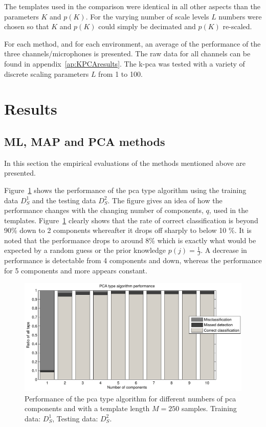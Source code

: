 The templates used in the comparison were identical in all other aspects than the parameters $K$ and $p(K)$. For the varying number of scale levels $L$ numbers were chosen so that $K$ and $p(K)$ could simply be decimated and $p(K)$ re-scaled.

For each method, and for each environment, an average of the performance of the three channels/microphones is presented. The raw data for all channels can be found in appendix~\ref{ap:KPCAresults}. The \gls{k-pca} was tested with a variety of discrete scaling parameters $L$ from 1 to 100.

\section{Results}\label{sec:results}
\subsection{ML, MAP and PCA methods}
In this section the empirical evaluations of the methods mentioned above are presented.

Figure~\ref{fig:PCAperform} shows the performance of the \gls{pca} type algorithm using the training data $D^1_S$ and the testing data $D^2_S$. The figure gives an idea of how the performance changes with the changing number of components, $q$, used in the templates. Figure~\ref{fig:PCAperform} clearly shows that the rate of correct classification is beyond 90\% down to 2 components whereafter it drops off sharply to below 10 \%. It is noted that the performance drops to around 8\% which is exactly what would be expected by a random guess or the prior knowledge $p(j)= \frac{1}{J}$. A decrease in performance is detectable from 4 components and down, whereas the performance for 5 components and more appears constant.

\begin{figure}[!] %
\centering
\includegraphics[width=150mm]{PCAperform.pdf}
\caption{Performance of the \gls{pca} type algorithm for different numbers of \gls{pca} components and with a template length $M=250$ samples. Training data: $D^1_S$, Testing data: $D^2_S$.}\label{fig:PCAperform}
\end{figure}

